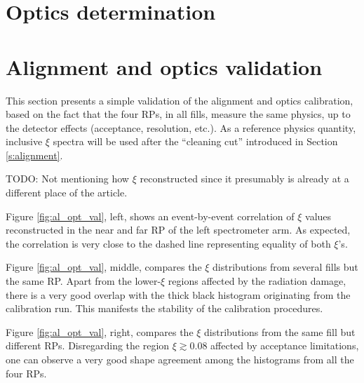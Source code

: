 \documentclass{article}
\def\TODO#1{{\color{red}TODO: #1}}
\begin{document}
\section{Optics determination}
\label{s:optics}



\section{Alignment and optics validation}
\label{s:validataion}

This section presents a simple validation of the alignment and optics calibration, based on the fact that the four RPs, in all fills, measure the same physics, up to the detector effects (acceptance, resolution, etc.). As a reference physics quantity, inclusive $\xi$ spectra will be used after the ``cleaning cut'' introduced in Section \ref{s:alignment}.

\TODO{Not mentioning how $\xi$ reconstructed since it presumably is already at a different place of the article.}

Figure \ref{fig:al_opt_val}, left, shows an event-by-event correlation of $\xi$ values reconstructed in the near and far RP of the left spectrometer arm. As expected, the correlation is very close to the dashed line representing equality of both $\xi$'s.

Figure \ref{fig:al_opt_val}, middle, compares the $\xi$ distributions from several fills but the same RP. Apart from the lower-$\xi$ regions affected by the radiation damage, there is a very good overlap with the thick black histogram originating from the calibration run. This manifests the stability of the calibration procedures.

Figure \ref{fig:al_opt_val}, right, compares the $\xi$ distributions from the same fill but different RPs. Disregarding the region $\xi\gtrsim 0.08$ affected by acceptance limitations, one can observe a very good shape agreement among the histograms from all the four RPs.
\end{document}
